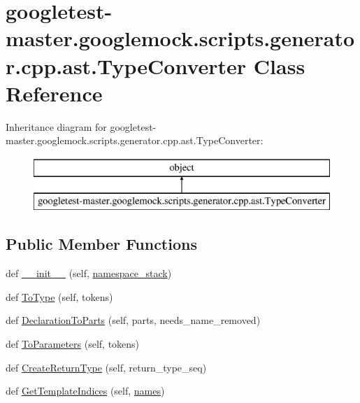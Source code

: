 \hypertarget{classgoogletest-master_1_1googlemock_1_1scripts_1_1generator_1_1cpp_1_1ast_1_1_type_converter}{}\section{googletest-\/master.googlemock.\+scripts.\+generator.\+cpp.\+ast.\+Type\+Converter Class Reference}
\label{classgoogletest-master_1_1googlemock_1_1scripts_1_1generator_1_1cpp_1_1ast_1_1_type_converter}
Inheritance diagram for googletest-\/master.googlemock.\+scripts.\+generator.\+cpp.\+ast.\+Type\+Converter\+:\begin{figure}[H]
\begin{center}
\leavevmode
\includegraphics[height=2.000000cm]{d1/dcf/classgoogletest-master_1_1googlemock_1_1scripts_1_1generator_1_1cpp_1_1ast_1_1_type_converter}
\end{center}
\end{figure}
\subsection*{Public Member Functions}
\begin{DoxyCompactItemize}
\item 
def \mbox{\hyperlink{classgoogletest-master_1_1googlemock_1_1scripts_1_1generator_1_1cpp_1_1ast_1_1_type_converter_a5567588cc285796dcc37f47cce576576}{\+\_\+\+\_\+init\+\_\+\+\_\+}} (self, \mbox{\hyperlink{classgoogletest-master_1_1googlemock_1_1scripts_1_1generator_1_1cpp_1_1ast_1_1_type_converter_a538f21b1fb4b67e25f20a5aaa8d1058c}{namespace\+\_\+stack}})
\item 
def \mbox{\hyperlink{classgoogletest-master_1_1googlemock_1_1scripts_1_1generator_1_1cpp_1_1ast_1_1_type_converter_a269ec1186f662559c27197a2627a02b9}{To\+Type}} (self, tokens)
\item 
def \mbox{\hyperlink{classgoogletest-master_1_1googlemock_1_1scripts_1_1generator_1_1cpp_1_1ast_1_1_type_converter_a7fe952b3b31c37db184eb81b493014e8}{Declaration\+To\+Parts}} (self, parts, needs\+\_\+name\+\_\+removed)
\item 
def \mbox{\hyperlink{classgoogletest-master_1_1googlemock_1_1scripts_1_1generator_1_1cpp_1_1ast_1_1_type_converter_ad42beee150af5ac3465402bf3f0e32e0}{To\+Parameters}} (self, tokens)
\item 
def \mbox{\hyperlink{classgoogletest-master_1_1googlemock_1_1scripts_1_1generator_1_1cpp_1_1ast_1_1_type_converter_ae69aa7b5a5b20662a2bb63cc5c5b977e}{Create\+Return\+Type}} (self, return\+\_\+type\+\_\+seq)
\item 
def \mbox{\hyperlink{classgoogletest-master_1_1googlemock_1_1scripts_1_1generator_1_1cpp_1_1ast_1_1_type_converter_ac0fec3aa8e10f05522f7a05b338a125e}{Get\+Template\+Indices}} (self, \mbox{\hyperlink{_mutual_8h_a78a6dba1026eca68e2950c3857634cb3}{names}})
\end{DoxyCompactItemize}
